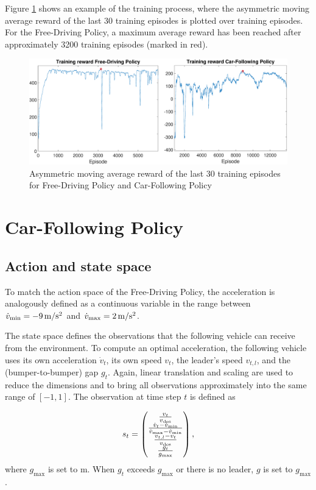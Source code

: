 \documentclass[review]{elsarticle}
\providecommand{\sub}[1]{_{\mathrm{#1}}}  %
\providecommand{\3}{{\ss}}
\begin{document}
	Figure \ref{fig:TrainingReward} shows an example of the training
	process, where the asymmetric moving average reward of the last 30 training episodes is plotted over training episodes. For the Free-Driving Policy, a maximum average reward has been reached after approximately 3200 training episodes (marked in red).
	\begin{figure}
		\centering
		\includegraphics[width=12cm]{images/TrainingReward}
		\caption{Asymmetric moving average reward of the last 30 training episodes for Free-Driving Policy and Car-Following Policy} 
		\label{fig:TrainingReward}
	\end{figure}
	
	\section{Car-Following Policy}
	\label{sec:CarFollowingPolicy}
	\subsection{Action and state space}
	\label{stateSpaceFollow}
	To match the action space of the Free-Driving Policy, the acceleration is analogously defined as a continuous variable in the range between $\dot{v}\sub{min} = \unit[-9]{m/s^2}$ and $\dot{v}\sub{max} =\unit[2]{m/s^2}$.	
	
	The state space defines the observations that the following
	vehicle can receive from the environment. To compute an optimal
	acceleration, the following vehicle uses its own acceleration $\dot{v}_t$,
	its own speed $v_t$, the leader's speed $v_{t,l}$,
	and the (bumper-to-bumper) gap $g_t$.
	Again, linear translation and scaling are used
	to reduce the dimensions and to bring all observations approximately
	into the same range of $[-1,1]$. The observation at time step $t$ is defined as
	
	\begin{equation}
	\label{eq:stateFollow}
	s_t = 
	\begin{pmatrix} 
	\frac{v_t}{v\sub{des}} \\ 
	\frac{\dot{v}_t-\dot{v}\sub{min}}{\dot{v}\sub{max} - \dot{v}\sub{min}}\\
	\frac{v_{t,l}-v_t}{v\sub{des}}\\
	\frac{g_t}{g\sub{\rm max}}
	
	\end{pmatrix},
	\end{equation}
	where $g\sub{max}$ is set to  \unit[200]{m}. When $g_t$ exceeds  $g\sub{max}$ or there is no leader, $g$ is set to  $g\sub{max}$.
	
\end{document}
